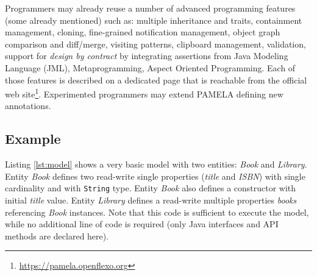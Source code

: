 Programmers may already reuse a number of advanced programming features
(some already mentioned) such as: multiple inheritance and traits, containment
management, cloning, fine-grained notification management, object graph
comparison and diff/merge, visiting patterns, clipboard management, validation,
support for \emph{design by contract} by integrating assertions from Java
Modeling Language (JML), Metaprogramming, Aspect Oriented Programming. Each of
those features is described on a dedicated page that is reachable from the
official web site\footnote{\url{https://pamela.openflexo.org}}.
Experimented programmers may extend PAMELA defining new annotations.


\subsection{Example}

Listing \ref{lst:model} shows a very basic model with two entities: \emph{Book} and \emph{Library}. Entity \emph{Book} defines two read-write single properties (\emph{title} and \emph{ISBN}) with single cardinality and with \texttt{String} type. Entity \emph{Book} also defines a constructor with initial \emph{title} value. Entity \emph{Library} defines a read-write multiple properties \emph{books} referencing \emph{Book} instances. Note that this code is sufficient to execute the model, while no additional line of code is required (only Java interfaces and API methods are declared here). 

